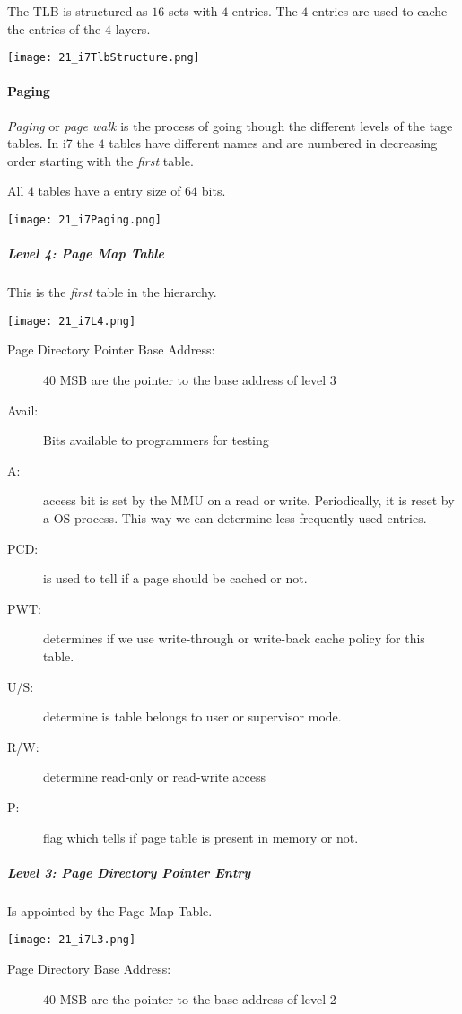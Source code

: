 The TLB is structured as $16$ sets with $4$ entries. The $4$ entries are used to cache the entries of the $4$ layers.

\texttt{[image: 21\_i7TlbStructure.png]}

\paragraph{Paging}
\textit{Paging} or \textit{page walk} is the process of going though the different levels of the tage tables. In i7 the $4$ tables have different names and are numbered in decreasing order starting with the \textit{first} table.

All $4$ tables have a entry size of $64$ bits.

\texttt{[image: 21\_i7Paging.png]}

\subparagraph{Level 4: Page Map Table}
This is the \textit{first} table in the hierarchy.

\texttt{[image: 21\_i7L4.png]}

\begin{description}
    \item[Page Directory Pointer Base Address:] $40$ MSB are the pointer to the base address of level 3
    \item[Avail:] Bits available to programmers for testing
    \item[A:] access bit is set by the MMU on a read or write. Periodically, it is reset by a OS process. This way we can determine less frequently used entries.
    \item[PCD:] is used to tell if a page should be cached or not.
    \item[PWT:] determines if we use write-through or write-back cache policy for this table.
    \item[U/S:] determine is table belongs to user or supervisor mode.
    \item[R/W:] determine read-only or read-write access
    \item[P:] flag which tells if page table is present in memory or not.
\end{description}

\subparagraph{Level 3: Page Directory Pointer Entry}
Is appointed by the Page Map Table.

\texttt{[image: 21\_i7L3.png]}

\begin{description}
    \item[Page Directory Base Address:] $40$ MSB are the pointer to the base address of level 2
\end{description}


